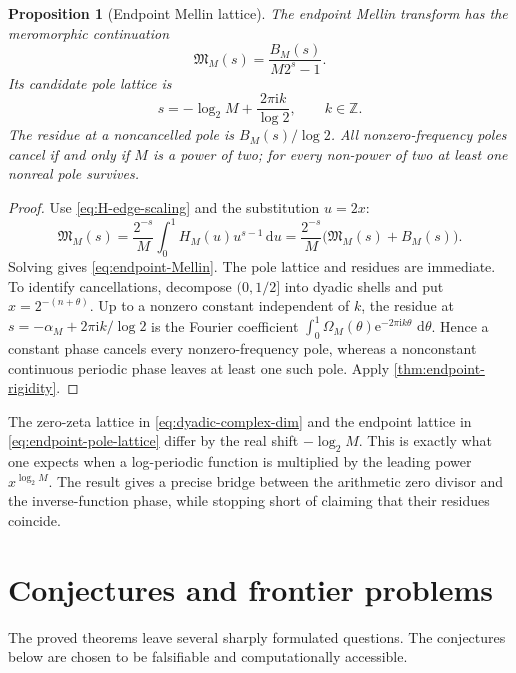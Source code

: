 \documentclass[11pt,oneside]{article}
\newtheorem{proposition}[theorem]{Proposition}
\theoremstyle{definition}
\theoremstyle{remark}
\newcommand{\Z}{\mathbb Z}
\newcommand{\e}{\mathrm e}
\newcommand{\ii}{\mathrm i}
\newcommand{\dd}{\,\mathrm d}
\numberwithin{equation}{section}
\newcommand{\1}{\mathbf 1}
\begin{document}
\begin{proposition}[Endpoint Mellin lattice]
\label{prop:endpoint-Mellin}
The endpoint Mellin transform has the meromorphic continuation
\begin{equation}
 \boxed{
 \mathfrak M_M(s)=\frac{B_M(s)}{M2^s-1}.}
 \label{eq:endpoint-Mellin}
\end{equation}
Its candidate pole lattice is
\begin{equation}
 s=-\log_2M+\frac{2\pi\ii k}{\log2},
 \qquad k\in\Z.
 \label{eq:endpoint-pole-lattice}
\end{equation}
The residue at a noncancelled pole is $B_M(s)/\log2$.  All nonzero-frequency poles cancel
if and only if $M$ is a power of two; for every non-power of two at least one nonreal pole
survives.
\end{proposition}

\begin{proof}
Use \eqref{eq:H-edge-scaling} and the substitution $u=2x$:
\[
 \mathfrak M_M(s)
 =\frac{2^{-s}}M\int_0^1H_M(u)u^{s-1}\dd u
 =\frac{2^{-s}}M\bigl(\mathfrak M_M(s)+B_M(s)\bigr).
\]
Solving gives \eqref{eq:endpoint-Mellin}.  The pole lattice and residues are immediate.
To identify cancellations, decompose $(0,1/2]$ into dyadic shells and put
$x=2^{-(n+\theta)}$.  Up to a nonzero constant independent of $k$, the residue at
$s=-\alpha_M+2\pi\ii k/\log2$ is the Fourier coefficient
$\int_0^1\Omega_M(\theta)\e^{-2\pi\ii k\theta}\,\dd\theta$.  Hence a constant
phase cancels every nonzero-frequency pole, whereas a nonconstant continuous periodic
phase leaves at least one such pole.  Apply \cref{thm:endpoint-rigidity}.
\end{proof}

The zero-zeta lattice in \eqref{eq:dyadic-complex-dim} and the endpoint lattice in
\eqref{eq:endpoint-pole-lattice} differ by the real shift $-\log_2M$.  This is exactly what
one expects when a log-periodic function is multiplied by the leading power
$x^{\log_2M}$.  The result gives a precise bridge between the arithmetic zero divisor and
the inverse-function phase, while stopping short of claiming that their residues coincide.

\section{Conjectures and frontier problems}
\label{sec:conjectures}

The proved theorems leave several sharply formulated questions.  The conjectures below are
chosen to be falsifiable and computationally accessible.
\end{document}
